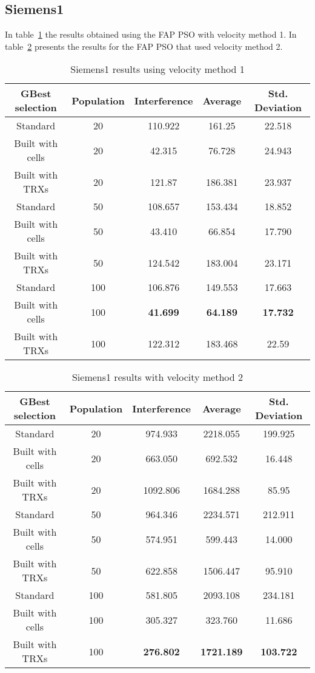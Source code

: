 \subsection{Siemens1}
In table~\ref{tab:siem1m1} the results obtained using the FAP PSO with velocity method 1. In table~\ref{tab:siem1m2} presents the results for the FAP PSO that used velocity method 2.
\begin{table}[H]
\centering
	\begin{tabular}{| c | c | c | c | c |}
	\hline
	GBest selection & Population & Interference & Average & Std. Deviation\\ \hline
	Standard & 20 & 110.922 & 161.25 & 22.518 \\ \hline
	Built with cells & 20 & 42.315 & 76.728 & 24.943\\ \hline
	Built with TRXs & 20 & 121.87 & 186.381 & 23.937\\ \hline
	Standard & 50 & 108.657 & 153.434 & 18.852\\ \hline
	Built with cells & 50 & 43.410 & 66.854 & 17.790\\ \hline
	Built with TRXs & 50 & 124.542 & 183.004 & 23.171\\ \hline
	Standard & 100 & 106.876 & 149.553 & 17.663\\ \hline
	Built with cells & 100 & \textbf{41.699} & \textbf{64.189} & \textbf{17.732}\\ \hline
	Built with TRXs & 100 & 122.312 & 183.468 & 22.59\\ \hline
	\end{tabular}
	\caption{Siemens1 results using velocity method 1}
	\label{tab:siem1m1}
\end{table}
\begin{table}[H]
\centering
	\begin{tabular}{| c | c | c | c | c |}
	\hline
	GBest selection & Population & Interference & Average & Std. Deviation\\ \hline
	Standard & 20 & 974.933 & 2218.055 & 199.925\\ \hline
	Built with cells & 20 & 663.050 & 692.532 & 16.448\\ \hline
	Built with TRXs & 20 & 1092.806 & 1684.288 & 85.95\\ \hline
	Standard & 50 & 964.346 & 2234.571 & 212.911\\ \hline
	Built with cells & 50 & 574.951 & 599.443 & 14.000\\ \hline
	Built with TRXs & 50 & 622.858 & 1506.447 & 95.910\\ \hline
	Standard & 100 & 581.805 & 2093.108 & 234.181\\ \hline
	Built with cells & 100 & 305.327 & 323.760 & 11.686\\ \hline
	Built with TRXs & 100 & \textbf{276.802} & \textbf{1721.189} & \textbf{103.722}\\ \hline
	\end{tabular}
	\caption{Siemens1 results with velocity method 2}
	\label{tab:siem1m2}
\end{table}
